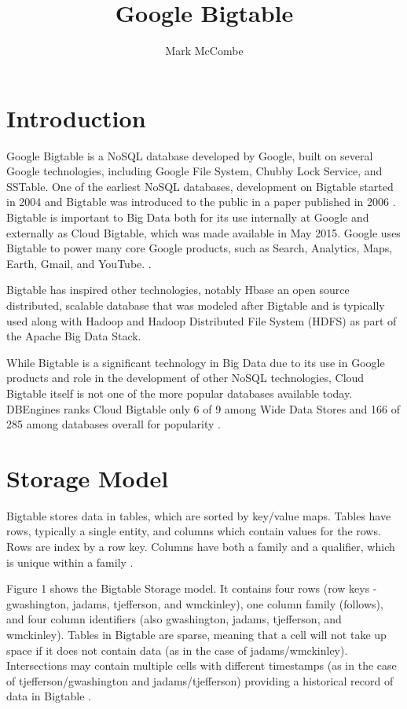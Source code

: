 \documentclass[9pt,twocolumn,twoside]{../../styles/osajnl}
\title{Google Bigtable}
\author[1,*]{Mark McCombe}
\affil[1]{School of Informatics and Computing, Bloomington, IN 47408, U.S.A.}
\affil[*]{Corresponding authors: mmccombe@iu.edu}
\begin{document}
\maketitle

\section{Introduction}

Google Bigtable is a NoSQL database developed by Google, built on several Google technologies, including Google File System, Chubby Lock Service, and SSTable\cite{www-wikibigtable}.  One of the earliest NoSQL databases, development on Bigtable started in 2004 and Bigtable was introduced to the public in a paper published in 2006 \cite{introbigtable}. Bigtable is important to Big Data both for its use internally at Google and externally as Cloud Bigtable, which was made available in May 2015. Google uses Bigtable to power many core Google products, such as Search, Analytics, Maps, Earth, Gmail, and YouTube. \cite{www-wikibigtable}.

Bigtable has inspired other technologies, notably Hbase \cite{www-hbase} an open source distributed, scalable database that was modeled after Bigtable and is typically used along with Hadoop and Hadoop Distributed File System (HDFS) as part of the Apache Big Data Stack.

While Bigtable is a significant technology in Big Data due to its use in Google products and role in the development of other NoSQL technologies, Cloud Bigtable itself is not one of the more popular databases available today.  DBEngines ranks Cloud Bigtable only 6 of 9 among Wide Data Stores and 166 of 285 among databases overall for popularity \cite{www-dbengines}.

\section{Storage Model}

Bigtable stores data in tables, which are sorted by key/value maps. Tables have rows, typically a single entity, and columns which contain values for the rows. Rows are index by a row key. Columns have both a family and a qualifier, which is unique within a family \cite{www-bigtabledocoverview}.

Figure 1 shows the Bigtable Storage model. It contains four rows (row keys - gwashington, jadams, tjefferson, and wmckinley), one column family (follows), and four column identifiers (also gwashington, jadams, tjefferson, and wmckinley). Tables in Bigtable are sparse, meaning that a cell will not take up space if it does not contain data (as in the case of jadams/wmckinley).  Intersections may contain multiple cells with different timestamps (as in the case of tjefferson/gwashington and jadams/tjefferson) providing a historical record of data in Bigtable \cite{www-bigtabledocoverview}.
\end{document}
